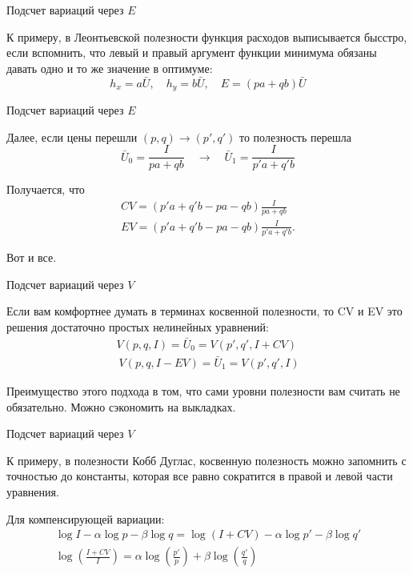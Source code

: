 \documentclass{beamer}
\begin{document}
\begin{frame}{Подсчет вариаций через $E$}

К примеру, в Леонтьевской полезности функция расходов выписывается бысстро, если вспомнить, что левый и правый аргумент функции минимума обязаны давать одно и то же значение в оптимуме: 
$$h_x = a \bar U, \quad h_y = b \bar U, \quad E = (pa + qb) \bar U$$
\end{frame}

\begin{frame}{Подсчет вариаций через $E$}

Далее, если цены перешли $(p,q) \to (p',q')$ то полезность перешла 
$$ \bar U_0 = \frac{I}{pa + qb} \quad \to \quad \bar U_1 = \frac{I}{p'a + q'b} $$

Получается, что
\begin{gather*}
CV = (p'a + q' b - pa - qb) \frac{I}{pa + qb}\\
EV = (p'a + q' b - pa - qb) \frac{I}{p' a + q' b}.
\end{gather*}

Вот и все.
\end{frame}

\begin{frame}{Подсчет вариаций через $V$}

Если вам комфортнее думать в терминах косвенной полезности, то CV и EV это решения достаточно простых нелинейных уравнений:
\begin{gather*}
V(p,q,I) = \bar U_0 = V(p',q',I+CV)\\\
V(p,q,I-EV) = \bar U_1 = V(p',q',I)
\end{gather*}

Преимущество этого подхода в том, что сами уровни полезности вам считать не обязательно. Можно сэкономить на выкладках.

\end{frame}

\begin{frame}{Подсчет вариаций через $V$}

К примеру, в полезности Кобб Дуглас, косвенную полезность можно запомнить с точностью до константы, которая все равно сократится в правой и левой части уравнения.

Для компенсирующей вариации:
\begin{gather*}
 \log I - \alpha \log p - \beta \log q = \log (I+CV) - \alpha \log p' - \beta \log q'\\
 \log(\frac{I+CV}{I}) = \alpha \log (\frac{p'}{p}) + \beta \log (\frac{q'}{q})
\end{gather*}

\end{frame}
\end{document}
